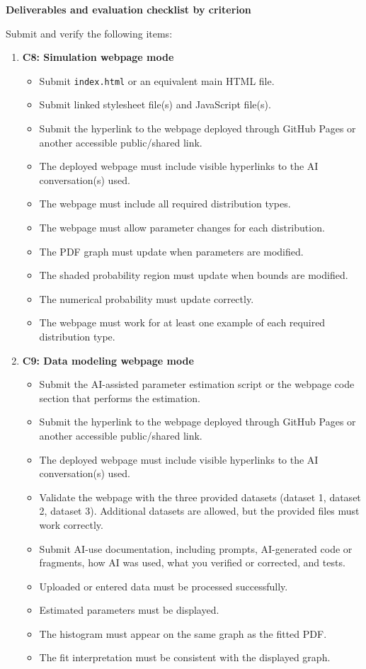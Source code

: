 \documentclass[12pt]{article}
\newcommand{\SubsectionBox}[1]{%
	\noindent\colorbox{gray!30}{%
		\parbox{\linewidth}{\textbf{#1}}%
	}\par\vspace{0.35cm}%
}
\begin{document}
	\SubsectionBox{Deliverables and evaluation checklist by criterion}
	Submit and verify the following items:
	\begin{enumerate}
		\item \textbf{C8: Simulation webpage mode}
		\begin{itemize}
			\item Submit \texttt{index.html} or an equivalent main HTML file.
			\item Submit linked stylesheet file(s) and JavaScript file(s).
			\item Submit the hyperlink to the webpage deployed through GitHub Pages or another accessible public/shared link.
			\item The deployed webpage must include visible hyperlinks to the AI conversation(s) used.
			\item The webpage must include all required distribution types.
			\item The webpage must allow parameter changes for each distribution.
			\item The PDF graph must update when parameters are modified.
			\item The shaded probability region must update when bounds are modified.
			\item The numerical probability must update correctly.
			\item The webpage must work for at least one example of each required distribution type.
		\end{itemize}
		
		\item \textbf{C9: Data modeling webpage mode}
		\begin{itemize}
			\item Submit the AI-assisted parameter estimation script or the webpage code section that performs the estimation.
			\item Submit the hyperlink to the webpage deployed through GitHub Pages or another accessible public/shared link.
			\item The deployed webpage must include visible hyperlinks to the AI conversation(s) used.
			\item Validate the webpage with the three provided datasets (dataset 1, dataset 2, dataset 3). Additional datasets are allowed, but the provided files must work correctly.
			\item Submit AI-use documentation, including prompts, AI-generated code or fragments, how AI was used, what you verified or corrected, and tests.
			\item Uploaded or entered data must be processed successfully.
			\item Estimated parameters must be displayed.
			\item The histogram must appear on the same graph as the fitted PDF.
			\item The fit interpretation must be consistent with the displayed graph.
		\end{itemize}
		

\end{enumerate}
\end{document}

